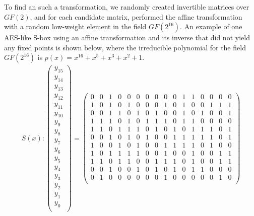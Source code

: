To find an such a transformation, we randomly created invertible matrices over $GF(2)$, and for each candidate matrix, performed the affine transformation with a random low-weight element in the field $GF(2^{16})$. An example of one AES-like S-box using an affine transformation and its inverse that did not yield any fixed points is shown below, where the irreducible polynomial for the field $GF(2^{16})$ is $p(x) = x^{16} + x^5 + x^3 + x^2 + 1$. 
\begin{align*}
S(x) : 
\begin{pmatrix}
y_{15} \\
y_{14} \\
y_{13} \\
y_{12} \\
y_{11} \\
y_{10} \\
y_{9} \\
y_{8} \\
y_{7} \\
y_{6} \\
y_{5} \\
y_{4} \\
y_{3} \\
y_{2} \\
y_{1} \\
y_{0} \\
\end{pmatrix}
=
\begin{pmatrix}
0 & 0 & 1 & 0 & 0 & 0 & 0 & 0 & 0 & 0 & 1 & 1 & 0 & 0 & 0 & 0 \\ 
1 & 0 & 1 & 0 & 1 & 0 & 0 & 0 & 1 & 0 & 1 & 0 & 0 & 1 & 1 & 1 \\ 
0 & 0 & 1 & 1 & 0 & 1 & 0 & 1 & 0 & 0 & 1 & 0 & 1 & 0 & 0 & 1 \\ 
1 & 1 & 1 & 0 & 1 & 0 & 1 & 1 & 1 & 0 & 1 & 1 & 0 & 0 & 0 & 0 \\ 
1 & 1 & 0 & 1 & 1 & 1 & 0 & 1 & 0 & 1 & 0 & 1 & 1 & 1 & 0 & 1 \\ 
0 & 0 & 1 & 0 & 1 & 0 & 1 & 0 & 0 & 1 & 1 & 1 & 1 & 1 & 0 & 1 \\ 
1 & 0 & 0 & 1 & 0 & 1 & 0 & 0 & 1 & 1 & 1 & 1 & 0 & 1 & 0 & 0 \\ 
1 & 0 & 1 & 1 & 1 & 1 & 0 & 0 & 1 & 0 & 0 & 1 & 0 & 0 & 1 & 1 \\ 
1 & 1 & 0 & 1 & 1 & 0 & 0 & 1 & 1 & 1 & 0 & 1 & 0 & 0 & 1 & 1 \\ 
0 & 0 & 1 & 0 & 0 & 1 & 0 & 1 & 0 & 1 & 0 & 1 & 1 & 0 & 0 & 0 \\ 
0 & 1 & 0 & 0 & 0 & 0 & 0 & 0 & 1 & 0 & 0 & 0 & 0 & 0 & 1 & 0 \\ 

\end{pmatrix}
\end{align*}
